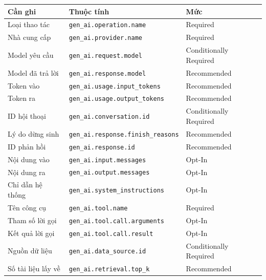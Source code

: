 \begin{table}[H]
\centering
\footnotesize
\begin{tabular}{@{}lll@{}}
\toprule
\textbf{Cần ghi} & \textbf{Thuộc tính} & \textbf{Mức} \\
\midrule
Loại thao tác & \texttt{gen\_\allowbreak ai.\allowbreak operation.\allowbreak name} & Required \\
Nhà cung cấp & \texttt{gen\_\allowbreak ai.\allowbreak provider.\allowbreak name} & Required \\
Model yêu cầu & \texttt{gen\_\allowbreak ai.\allowbreak request.\allowbreak model} & Conditionally Required \\
Model đã trả lời & \texttt{gen\_\allowbreak ai.\allowbreak response.\allowbreak model} & Recommended \\
Token vào & \texttt{gen\_\allowbreak ai.\allowbreak usage.\allowbreak input\_\allowbreak tokens} & Recommended \\
Token ra & \texttt{gen\_\allowbreak ai.\allowbreak usage.\allowbreak output\_\allowbreak tokens} & Recommended \\
ID hội thoại & \texttt{gen\_\allowbreak ai.\allowbreak conversation.\allowbreak id} & Conditionally Required \\
Lý do dừng sinh & \texttt{gen\_\allowbreak ai.\allowbreak response.\allowbreak finish\_\allowbreak reasons} & Recommended \\
ID phản hồi & \texttt{gen\_ai.response.id} & Recommended \\
Nội dung vào & \texttt{gen\_\allowbreak ai.\allowbreak input.\allowbreak messages} & Opt-In \\
Nội dung ra & \texttt{gen\_\allowbreak ai.\allowbreak output.\allowbreak messages} & Opt-In \\
Chỉ dẫn hệ thống & \texttt{gen\_\allowbreak ai.\allowbreak system\_\allowbreak instructions} & Opt-In \\
\midrule
Tên công cụ & \texttt{gen\_ai.tool.name} & Required \\
Tham số lời gọi & \texttt{gen\_\allowbreak ai.\allowbreak tool.\allowbreak call.\allowbreak arguments} & Opt-In \\
Kết quả lời gọi & \texttt{gen\_\allowbreak ai.\allowbreak tool.\allowbreak call.\allowbreak result} & Opt-In \\
\midrule
Nguồn dữ liệu & \texttt{gen\_\allowbreak ai.\allowbreak data\_\allowbreak source.\allowbreak id} & Conditionally Required \\
Số tài liệu lấy về & \texttt{gen\_\allowbreak ai.\allowbreak retrieval.\allowbreak top\_\allowbreak k} & Recommended \\

\end{tabular}
\end{table}
